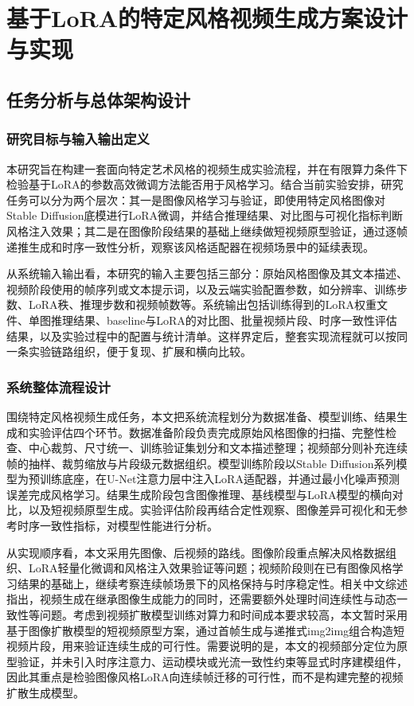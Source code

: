 
\chapter{基于LoRA的特定风格视频生成方案设计与实现}

\section{任务分析与总体架构设计}

\subsection{研究目标与输入输出定义}

本研究旨在构建一套面向特定艺术风格的视频生成实验流程，并在有限算力条件下检验基于LoRA的参数高效微调方法能否用于风格学习。结合当前实验安排，研究任务可以分为两个层次：其一是图像风格学习与验证，即使用特定风格图像对Stable Diffusion底模进行LoRA微调，并结合推理结果、对比图与可视化指标判断风格注入效果；其二是在图像阶段结果的基础上继续做短视频原型验证，通过逐帧递推生成和时序一致性分析，观察该风格适配器在视频场景中的延续表现。

从系统输入输出看，本研究的输入主要包括三部分：原始风格图像及其文本描述、视频阶段使用的帧序列或文本提示词，以及云端实验配置参数，如分辨率、训练步数、LoRA秩、推理步数和视频帧数等。系统输出包括训练得到的LoRA权重文件、单图推理结果、baseline与LoRA的对比图、批量视频片段、时序一致性评估结果，以及实验过程中的配置与统计清单。这样界定后，整套实现流程就可以按同一条实验链路组织，便于复现、扩展和横向比较。

\subsection{系统整体流程设计}

围绕特定风格视频生成任务，本文把系统流程划分为数据准备、模型训练、结果生成和实验评估四个环节。数据准备阶段负责完成原始风格图像的扫描、完整性检查、中心裁剪、尺寸统一、训练验证集划分和文本描述整理；视频部分则补充连续帧的抽样、裁剪缩放与片段级元数据组织。模型训练阶段以Stable Diffusion系列模型为预训练底座，在U-Net注意力层中注入LoRA适配器，并通过最小化噪声预测误差完成风格学习。结果生成阶段包含图像推理、基线模型与LoRA模型的横向对比，以及短视频原型生成。实验评估阶段再结合定性观察、图像差异可视化和无参考时序一致性指标，对模型性能进行分析。

从实现顺序看，本文采用先图像、后视频的路线。图像阶段重点解决风格数据组织、LoRA轻量化微调和风格注入效果验证等问题；视频阶段则在已有图像风格学习结果的基础上，继续考察连续帧场景下的风格保持与时序稳定性。相关中文综述指出，视频生成在继承图像生成能力的同时，还需要额外处理时间连续性与动态一致性等问题\cite{ref35}。考虑到视频扩散模型训练对算力和时间成本要求较高，本文暂时采用基于图像扩散模型的短视频原型方案，通过首帧生成与递推式img2img组合构造短视频片段，用来验证连续生成的可行性。需要说明的是，本文的视频部分定位为原型验证，并未引入时序注意力、运动模块或光流一致性约束等显式时序建模组件，因此其重点是检验图像风格LoRA向连续帧迁移的可行性，而不是构建完整的视频扩散生成模型。

